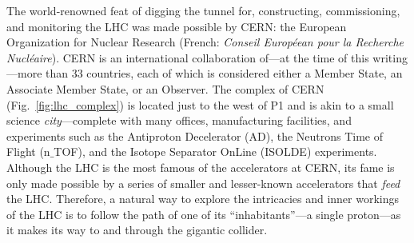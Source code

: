 The world-renowned feat of digging the tunnel for, constructing, commissioning, and monitoring the LHC was made possible by CERN:
the European Organization for Nuclear Research (French: \emph{Conseil Européean pour la Recherche Nucléaire}).
CERN is an international collaboration of---at the time of this writing---more than 33 countries,
each of which is considered either a Member State, an Associate Member State, or an Observer.
The complex of CERN (Fig.~\ref{fig:lhc_complex}) is located just to the west of P1 and is akin to a small science \emph{city}---complete with many offices, manufacturing facilities, and experiments such as the Antiproton Decelerator (AD), the Neutrons Time of Flight (n$\_$TOF), and the Isotope Separator OnLine (ISOLDE) experiments.
Although the LHC is the most famous of the accelerators at CERN, its fame is only made possible by a series of smaller and lesser-known accelerators that \emph{feed} the LHC.
Therefore, a natural way to explore the intricacies and inner workings of the LHC is to follow the path of one of its ``inhabitants''---a single proton---as it makes its way to and through the gigantic collider.
